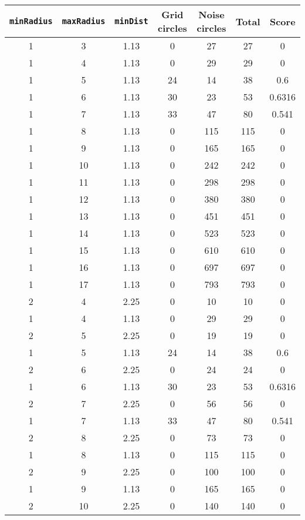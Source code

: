 \documentclass[letterpaper, 12pt]{article}
\begin{document}
\begin{longtable}{|c|c|c|c|c|c|c|}
\hline
\textbf{\texttt{minRadius}} & \textbf{\texttt{maxRadius}} & \textbf{\texttt{minDist}} & \textbf{Grid circles} & \textbf{Noise circles} & \textbf{Total} & \textbf{Score} \\
\hline
1 & 3 & 1.13 & 0 & 27 & 27 & 0 \\
\hline
1 & 4 & 1.13 & 0 & 29 & 29 & 0 \\
\hline
1 & 5 & 1.13 & 24 & 14 & 38 & 0.6 \\
\hline
1 & 6 & 1.13 & 30 & 23 & 53 & 0.6316 \\
\hline
1 & 7 & 1.13 & 33 & 47 & 80 & 0.541 \\
\hline
1 & 8 & 1.13 & 0 & 115 & 115 & 0 \\
\hline
1 & 9 & 1.13 & 0 & 165 & 165 & 0 \\
\hline
1 & 10 & 1.13 & 0 & 242 & 242 & 0 \\
\hline
1 & 11 & 1.13 & 0 & 298 & 298 & 0 \\
\hline
1 & 12 & 1.13 & 0 & 380 & 380 & 0 \\
\hline
1 & 13 & 1.13 & 0 & 451 & 451 & 0 \\
\hline
1 & 14 & 1.13 & 0 & 523 & 523 & 0 \\
\hline
1 & 15 & 1.13 & 0 & 610 & 610 & 0 \\
\hline
1 & 16 & 1.13 & 0 & 697 & 697 & 0 \\
\hline
1 & 17 & 1.13 & 0 & 793 & 793 & 0 \\
\hline
2 & 4 & 2.25 & 0 & 10 & 10 & 0 \\
\hline
1 & 4 & 1.13 & 0 & 29 & 29 & 0 \\
\hline
2 & 5 & 2.25 & 0 & 19 & 19 & 0 \\
\hline
1 & 5 & 1.13 & 24 & 14 & 38 & 0.6 \\
\hline
2 & 6 & 2.25 & 0 & 24 & 24 & 0 \\
\hline
1 & 6 & 1.13 & 30 & 23 & 53 & 0.6316 \\
\hline
2 & 7 & 2.25 & 0 & 56 & 56 & 0 \\
\hline
1 & 7 & 1.13 & 33 & 47 & 80 & 0.541 \\
\hline
2 & 8 & 2.25 & 0 & 73 & 73 & 0 \\
\hline
1 & 8 & 1.13 & 0 & 115 & 115 & 0 \\
\hline
2 & 9 & 2.25 & 0 & 100 & 100 & 0 \\
\hline
1 & 9 & 1.13 & 0 & 165 & 165 & 0 \\
\hline
2 & 10 & 2.25 & 0 & 140 & 140 & 0 \\

\end{longtable}
\end{document}
